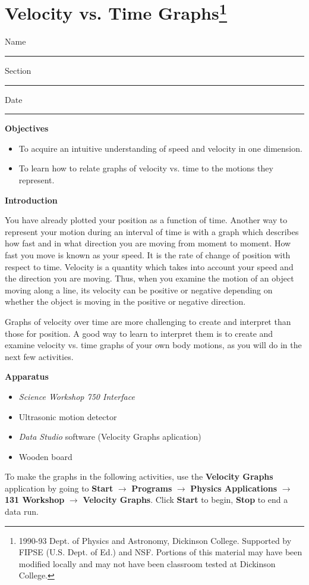 
\section{Velocity vs. Time Graphs\footnote{
1990-93 Dept. of Physics and Astronomy, Dickinson College. Supported by FIPSE
(U.S. Dept. of Ed.) and NSF. Portions of this material may have been modified
locally and may not have been classroom tested at Dickinson College.
}}

Name \rule{2.0in}{0.1pt}\hfill{}Section \rule{1.0in}{0.1pt}\hfill{}Date \rule{1.0in}{0.1pt}

\textbf{Objectives }

\begin{itemize}
\item To acquire an intuitive understanding of speed and velocity in one dimension. 
\item To learn how to relate graphs of velocity vs. time to the motions they represent.
\end{itemize}
\textbf{Introduction} 

You have already plotted your position as a function of time. Another way to
represent your motion during an interval of time is with a graph which describes
how fast and in what direction you are moving from moment to moment. How fast
you move is known as your speed. It is the rate of change of position with respect
to time. Velocity is a quantity which takes into account your speed and the
direction you are moving. Thus, when you examine the motion of an object moving
along a line, its velocity can be positive or negative depending
on whether the object is moving in the positive or negative direction.

Graphs of velocity over time are more challenging to create and interpret than
those for position. A good way to learn to interpret them is to create and examine velocity vs. time graphs of your own body motions, as you will do in the next few activities.

\textbf{Apparatus}

\begin{itemize}
\item \textit{Science Workshop 750 Interface}
\item Ultrasonic motion detector
\item \textit{Data Studio} software (Velocity Graphs aplication)
\item Wooden board
\end{itemize}

To make the graphs in the following activities, use the \textbf{Velocity Graphs} application by going to \textbf{Start} $\rightarrow$ \textbf{Programs} $\rightarrow$ \textbf{Physics Applications} $\rightarrow$ \textbf{131 Workshop} $\rightarrow$ \textbf{Velocity Graphs}. Click \textbf{Start} to begin, \textbf{Stop} to end a data run.


